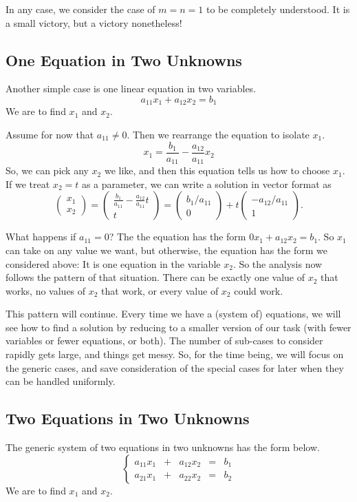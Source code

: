 \documentclass[00-livre-main.tex]{subfiles}
\begin{document}
In any case, we consider the case of $m=n=1$ to be completely understood. It is a small victory, but a victory nonetheless!

\subsection*{One Equation in Two Unknowns}

Another simple case is one linear equation in two variables.
\[
a_{11}x_1 + a_{12}x_2 = b_1
\]
We are to find $x_1$ and $x_2$.

Assume for now that $a_{11} \neq 0$. Then we rearrange the equation to isolate $x_1$.
\[
x_1 = \frac{b_1}{a_{11}} - \frac{a_{12}}{a_{11}} x_2
\]
So, we can pick any $x_2$ we like, and then this equation tells us how to choose $x_1$. If we treat $x_2 = t$ as a parameter, we can write a solution in vector format as
\[
\begin{pmatrix} x_1 \\ x_2 \end{pmatrix} = 
\begin{pmatrix} \frac{b_1}{a_{11}} - \frac{a_{12}}{a_{11}} t \\ t \end{pmatrix}
= \begin{pmatrix} b_1/a_{11} \\ 0 \end{pmatrix} + t\begin{pmatrix} -a_{12}/a_{11} \\ 1 \end{pmatrix} .
\]

What happens if $a_{11}=0$? The the equation has the form $0x_1 + a_{12}x_2 = b_1$. So $x_1$ can take on any value we want, but otherwise, the equation has the form we considered above: It is one equation in the variable $x_2$. So the analysis now follows the pattern of that situation. There can be exactly one value of $x_2$ that works, no values of $x_2$ that work, or every value of $x_2$ could work.

This pattern will continue. Every time we have a (system of) equations, we will see how to find a solution by reducing to a smaller version of our task (with fewer variables or fewer equations, or both). The number of sub-cases to consider rapidly gets large, and things get messy. So, for the time being, we will focus on the generic cases, and save consideration of the special cases for later when they can be handled uniformly.

\subsection*{Two Equations in Two Unknowns}
The generic system of two equations in two unknowns has the form below.
\[
\left\{ \begin{array}{rrrrr}
a_{11}x_1 & + & a_{12}x_2 & = & b_1 \\
a_{21}x_1 & + & a_{22}x_2 & = & b_2
\end{array}\right.
\]
We are to find $x_1$ and $x_2$.
\end{document}
